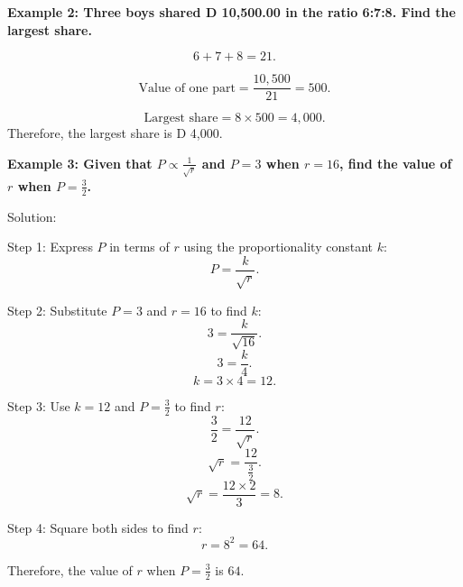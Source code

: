 \begin{flushleft}
\textbf{Example 2: Three boys shared D 10,500.00 in the ratio 6:7:8. Find the largest share.}


\[
6 + 7 + 8 = 21.
\]


\[
\text{Value of one part} = \frac{10,500}{21} = 500.
\]


\[
\text{Largest share} = 8 \times 500 = 4,000.
\]
Therefore, the largest share is D 4,000.
\end{flushleft}

\begin{flushleft}
\textbf{Example 3: Given that $P \propto \frac{1}{\sqrt{r}}$ and $P = 3$ when $r = 16$, find the value of $r$ when $P = \frac{3}{2}$.}

Solution:

Step 1: Express $P$ in terms of $r$ using the proportionality constant $k$:
\[
P = \frac{k}{\sqrt{r}}.
\]

Step 2: Substitute $P = 3$ and $r = 16$ to find $k$:
\[
3 = \frac{k}{\sqrt{16}}.
\]
\[
3 = \frac{k}{4}.
\]
\[
k = 3 \times 4 = 12.
\]

Step 3: Use $k = 12$ and $P = \frac{3}{2}$ to find $r$:
\[
\frac{3}{2} = \frac{12}{\sqrt{r}}.
\]
\[
\sqrt{r} = \frac{12}{\frac{3}{2}}.
\]
\[
\sqrt{r} = \frac{12 \times 2}{3} = 8.
\]

Step 4: Square both sides to find $r$:
\[
r = 8^2 = 64.
\]

Therefore, the value of $r$ when $P = \frac{3}{2}$ is $64$.
\end{flushleft}

